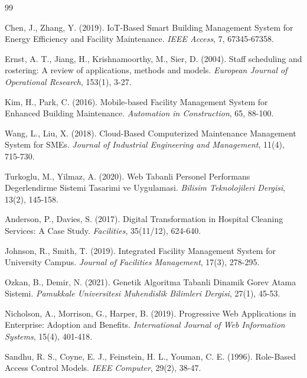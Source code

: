 
\begin{thebibliography}{99}

Chen, J., Zhang, Y. (2019). 
IoT-Based Smart Building Management System for Energy Efficiency and 
Facility Maintenance. 
\textit{IEEE Access}, 7, 67345-67358.

Ernst, A. T., Jiang, H., Krishnamoorthy, M., Sier, D. (2004). 
Staff scheduling and rostering: A review of applications, methods and models. 
\textit{European Journal of Operational Research}, 153(1), 3-27.

Kim, H., Park, C. (2016). 
Mobile-based Facility Management System for Enhanced Building Maintenance. 
\textit{Automation in Construction}, 65, 88-100.

Wang, L., Liu, X. (2018). 
Cloud-Based Computerized Maintenance Management System for SMEs. 
\textit{Journal of Industrial Engineering and Management}, 11(4), 715-730.

Turkoglu, M., Yilmaz, A. (2020). 
Web Tabanli Personel Performans Degerlendirme Sistemi Tasarimi ve Uygulamasi. 
\textit{Bilisim Teknolojileri Dergisi}, 13(2), 145-158.

Anderson, P., Davies, S. (2017). 
Digital Transformation in Hospital Cleaning Services: A Case Study. 
\textit{Facilities}, 35(11/12), 624-640.

Johnson, R., Smith, T. (2019). 
Integrated Facility Management System for University Campus. 
\textit{Journal of Facilities Management}, 17(3), 278-295.

Ozkan, B., Demir, N. (2021). 
Genetik Algoritma Tabanli Dinamik Gorev Atama Sistemi. 
\textit{Pamukkale Universitesi Muhendislik Bilimleri Dergisi}, 27(1), 45-53.

Nicholson, A., Morrison, G., Harper, B. (2019). 
Progressive Web Applications in Enterprise: Adoption and Benefits. 
\textit{International Journal of Web Information Systems}, 15(4), 401-418.

Sandhu, R. S., Coyne, E. J., Feinstein, H. L., Youman, C. E. (1996). 
Role-Based Access Control Models. 
\textit{IEEE Computer}, 29(2), 38-47.


\end{thebibliography}
